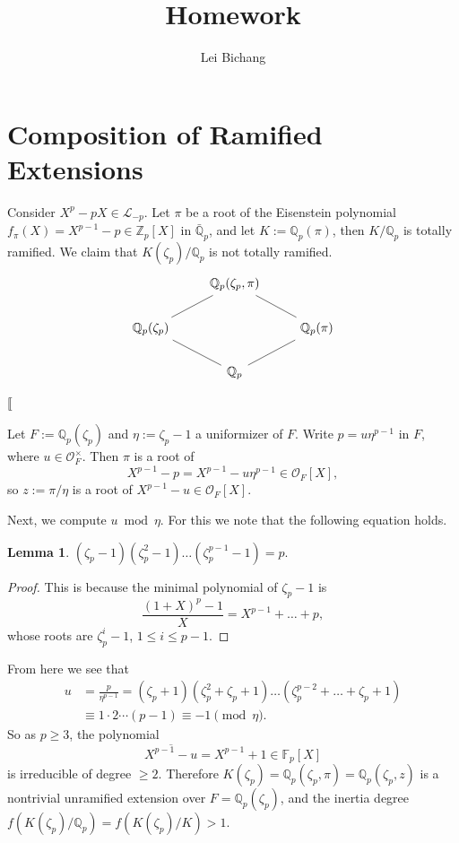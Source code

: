 \documentclass{article}
\title{Homework}
\author{Lei Bichang}
\date{}
\theoremstyle{definition}
\newtheorem{lemma}{Lemma}
\theoremstyle{remark}
\newcommand{\Q}{\mathbb{Q}}
\newcommand{\Z}{\mathbb{Z}}
\renewcommand{\O}{\mathcal{O}}
\newcommand{\F}{\mathbb{F}}
\begin{document}
\maketitle

\section{Composition of Ramified Extensions}
Consider $X^p - pX\in \mathcal{L}_{-p}$.
Let $\pi$ be a root of the Eisenstein polynomial $f_\pi(X) = X^{p-1} - p\in\Z_p[X]$ in $\bar{\Q}_p$,
and let $K := \Q_p(\pi)$, then $K/\Q_p$ is totally ramified. We claim that $K(\zeta_p)/\Q_p$ is not totally ramified.
\[\begin{tikzcd}
	& {\Q_p(\zeta_p, \pi)} \\
	{\Q_p(\zeta_p)} && {\Q_p(\pi)} \\
	& {\Q_p}
	\arrow[no head, from=1-2, to=2-3]
	\arrow[no head, from=2-1, to=1-2]
	\arrow[no head, from=2-1, to=3-2]
	\arrow[no head, from=3-2, to=2-3]
\end{tikzcd}\]

$\llbracket$

Let $F := \Q_p(\zeta_p)$ and $\eta := \zeta_p - 1$ a uniformizer of $F$.
Write $p = u\eta^{p-1}$ in $F$,
where $u\in \O_{F}^\times$.
Then $\pi$ is a root of \[X^{p-1} - p = X^{p-1} - u\eta^{p-1}\in \O_{F}[X],\]
so $z := \pi/\eta$ is a root of $X^{p-1} - u\in\O_F[X]$.

Next, we compute $u\bmod \eta$.
For this we note that the following equation holds.
\begin{lemma}
    $(\zeta_p - 1)(\zeta_p^2 - 1)\dots(\zeta_p^{p-1} - 1) = p$.
\end{lemma}
\begin{proof}
    This is because the minimal polynomial of $\zeta_p - 1$ is
    \[\frac{(1 + X)^p - 1}{X} = X^{p-1} + \dots  + p,\]
    whose roots are $\zeta_p^{i} - 1$, $1\le i\le p - 1$.
\end{proof}
From here we see that\begin{align*}
    u &= \frac p{\eta^{p-1}} = (\zeta_p + 1)(\zeta_p^2 + \zeta_p + 1)\dots (\zeta_p^{p-2} + \dots + \zeta_p + 1)\\
    &\equiv 1\cdot2\cdots (p-1) \equiv -1\pmod \eta.
\end{align*}
So as $p\ge 3$, the polynomial \[\overline{X^{p-1} - u} = X^{p-1} + 1\in\F_p[X]\] is irreducible of degree $\ge 2$.
Therefore $K(\zeta_p) = \Q_p(\zeta_p, \pi) = \Q_p(\zeta_p, z)$ is a nontrivial unramified extension over $F = \Q_p(\zeta_p)$,
and the inertia degree $f(K(\zeta_p)/\Q_p) = f(K(\zeta_p)/K) > 1$.
\end{document}
